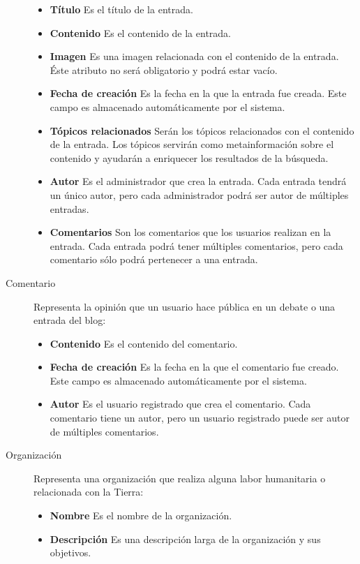 \begin{description}
							\begin{itemize}
							\item \textbf{Título}  Es el título de la entrada.
							\item \textbf{Contenido}  Es el contenido de la entrada.
							\item \textbf{Imagen}  Es una imagen relacionada con el contenido de la entrada.  Éste atributo no será obligatorio y podrá estar vacío.
							\item \textbf{Fecha de creación}  Es la fecha en la que la entrada fue creada.  Este campo es almacenado automáticamente por el sistema.
							\item \textbf{Tópicos relacionados}  Serán los tópicos relacionados con el contenido de la entrada.  Los tópicos servirán como metainformación sobre el contenido y ayudarán a enriquecer los resultados de la búsqueda.
							\item \textbf{Autor}  Es el administrador que crea la entrada.  Cada entrada tendrá un único autor, pero cada administrador podrá ser autor de múltiples entradas.
							\item \textbf{Comentarios}  Son los comentarios que los usuarios realizan en la entrada.  Cada entrada podrá tener múltiples comentarios, pero cada comentario sólo podrá pertenecer a una entrada.
							\end{itemize}
\item[Comentario]  Representa la opinión que un usuario hace pública en un debate o una entrada del blog:
							\begin{itemize}
							\item \textbf{Contenido}  Es el contenido del comentario.
							\item \textbf{Fecha de creación}  Es la fecha en la que el comentario fue creado.  Este campo es almacenado automáticamente por el sistema.
							\item \textbf{Autor}  Es el usuario registrado que crea el comentario.  Cada comentario tiene un autor, pero un usuario registrado puede ser autor de múltiples comentarios.
							\end{itemize}
\item[Organización]  Representa una organización que realiza alguna labor humanitaria o relacionada con la Tierra:
							\begin{itemize}
							\item \textbf{Nombre}  Es el nombre de la organización.
							\item \textbf{Descripción}  Es una descripción larga de la organización y sus objetivos.

\end{itemize}
\end{description}
